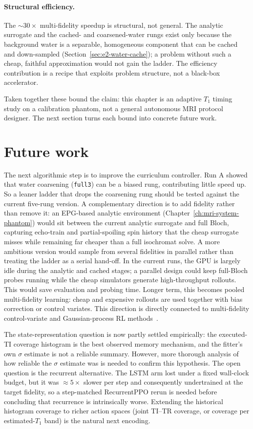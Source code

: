 \paragraph{Structural efficiency.} The ${\sim}30\times$ multi-fidelity speedup
is structural, not general. The analytic surrogate and the cached- and
coarsened-water rungs exist only because the background water is a separable,
homogeneous component that can be cached and down-sampled
(Section~\ref{sec:e2-water-cache}); a problem without such a cheap, faithful
approximation would not gain the ladder. The efficiency contribution is a recipe
that exploits problem structure, not a black-box accelerator.

Taken together these bound the claim: this chapter is an adaptive $T_1$ timing
study on a calibration phantom, not a general autonomous MRI protocol designer.
The next section turns each bound into concrete future work.

\section{Future work}
\label{sec:e2-future}

The next algorithmic step is to improve the curriculum controller. Run A showed
that water coarsening (\texttt{full3}) can be a biased rung, contributing little speed up. So a leaner ladder that drops the coarsening
rung should be tested against the current five-rung version. A complementary
direction is to add fidelity rather than remove it: an EPG-based analytic
environment (Chapter~\ref{ch:mri-system-phantom}) would sit between the current
analytic surrogate and full Bloch, capturing echo-train and partial-spoiling
spin history that the cheap surrogate misses while remaining far cheaper than a
full isochromat solve. A more ambitious version
would sample from several fidelities in parallel rather than treating the ladder
as a serial hand-off. In the current runs, the GPU is largely idle during the
analytic and cached stages; a parallel design could keep full-Bloch probes
running while the cheap simulators generate high-throughput rollouts. This would save evaluation and probing time. Longer
term, this becomes pooled multi-fidelity learning: cheap and expensive rollouts
are used together with bias correction or control variates. This direction is
directly connected to multi-fidelity control-variate and Gaussian-process RL
methods~\cite{khairy_control_variates_2024,suryan_multifidelity_gp_2020}.

The state-representation question is now partly settled empirically: the
executed-TI coverage histogram is the best observed memory mechanism, and the
fitter's own $\sigma$ estimate is not a reliable summary. However, more thorough analysis of how reliable the $\sigma$ estimate was is needed to confirm this hypothesis. The open question is
the recurrent alternative. The LSTM arm lost under a fixed wall-clock budget,
but it was ${\approx}5\times$ slower per step and consequently undertrained at
the target fidelity, so a step-matched RecurrentPPO rerun is needed before
concluding that recurrence is intrinsically worse. Extending the historical histogram coverage
to richer action spaces (joint TI--TR coverage, or coverage per
estimated-$T_1$ band) is the natural next encoding.

